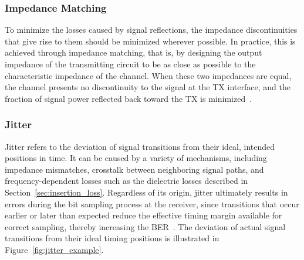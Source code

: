 \subsubsection{Impedance Matching}\label{sec:impedance_matching_detailed}

To minimize the losses caused by signal reflections, the impedance discontinuities that give rise to them should be minimized wherever possible. In practice, this is achieved through impedance matching, that is, by designing the output impedance of the transmitting circuit to be as close as possible to the characteristic impedance of the channel. When these two impedances are equal, the channel presents no discontinuity to the signal at the \ac{TX} interface, and the fraction of signal power reflected back toward the \ac{TX} is minimized~\cite{bogatin_SI,chen_switchable_cml_2016}.

\subsubsection{Jitter}\label{sec:jitter_detailed}

Jitter refers to the deviation of signal transitions from their ideal, intended positions in time. It can be caused by a variety of mechanisms, including impedance mismatches, crosstalk between neighboring signal paths, and frequency-dependent losses such as the dielectric losses described in Section~\ref{sec:insertion_loss}. Regardless of its origin, jitter ultimately results in errors during the bit sampling process at the receiver, since transitions that occur earlier or later than expected reduce the effective timing margin available for correct sampling, thereby increasing the \ac{BER}~\cite{yang_serial_links_1998}.
The deviation of actual signal transitions from their ideal timing positions is illustrated in Figure~\ref{fig:jitter_example}.

